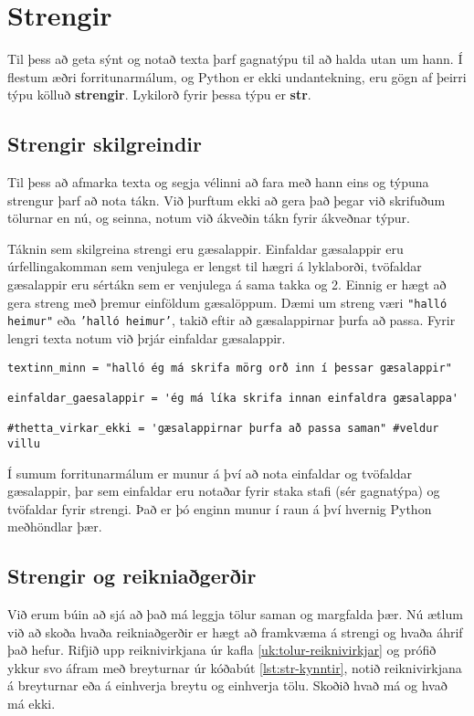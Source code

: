 

\chapter{Strengir}\label{k:strengir}
Til þess að geta sýnt og notað texta þarf gagnatýpu til að halda utan um hann.
Í flestum æðri forritunarmálum, og Python er ekki undantekning, eru gögn af þeirri týpu kölluð \textbf{strengir}.
Lykilorð fyrir þessa týpu er \textbf{str}.

\section{Strengir skilgreindir}
Til þess að afmarka texta og segja vélinni að fara með hann eins og týpuna strengur þarf að nota tákn.
Við þurftum ekki að gera það þegar við skrifuðum tölurnar en nú, og seinna, notum við ákveðin tákn fyrir ákveðnar týpur.

Táknin sem skilgreina strengi eru gæsalappir.
Einfaldar gæsalappir eru úrfellingakomman sem venjulega er lengst til hægri á lyklaborði, tvöfaldar gæsalappir eru sértákn sem er venjulega á sama takka og 2.
Einnig er hægt að gera streng með þremur einföldum gæsalöppum.
Dæmi um streng væri \texttt{"halló heimur"} eða \texttt{'halló heimur'}, takið eftir að gæsalappirnar þurfa að passa.
Fyrir lengri texta notum við þrjár einfaldar gæsalappir.

\begin{lstlisting}[caption=Strengir skilgreindir, label=lst:str-kynntir]
textinn_minn = "halló ég má skrifa mörg orð inn í þessar gæsalappir"

einfaldar_gaesalappir = 'ég má líka skrifa innan einfaldra gæsalappa'

#thetta_virkar_ekki = 'gæsalappirnar þurfa að passa saman" #veldur villu
\end{lstlisting}

Í sumum forritunarmálum er munur á því að nota einfaldar og tvöfaldar gæsalappir, þar sem einfaldar eru notaðar fyrir staka stafi (sér gagnatýpa) og tvöfaldar fyrir strengi.
Það er þó enginn munur í raun á því hvernig Python meðhöndlar þær.

\section{Strengir og reikniaðgerðir}
Við erum búin að sjá að það má leggja tölur saman og margfalda þær.
Nú ætlum við að skoða hvaða reikniaðgerðir er hægt að framkvæma á strengi og hvaða áhrif það hefur.
Rifjið upp reiknivirkjana úr kafla \ref{uk:tolur-reiknivirkjar} og prófið ykkur svo áfram með breyturnar úr kóðabút \ref{lst:str-kynntir}, notið reiknivirkjana á breyturnar eða á einhverja breytu og einhverja tölu.
Skoðið hvað má og hvað má ekki.

